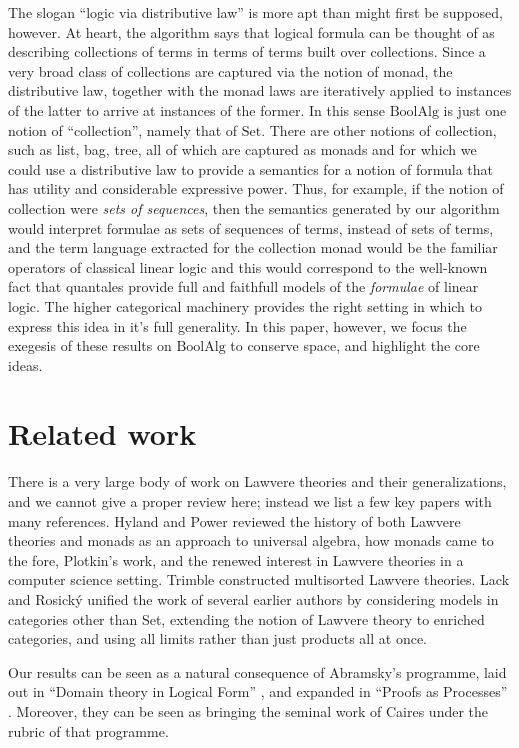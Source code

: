 \documentclass{llncs}
\newcommand{\Set}{\mathrm{Set}}
\newcommand{\BoolAlg}{\mathrm{BoolAlg}}
\begin{document}
The slogan ``logic via distributive law'' is more apt than might first
be supposed, however. At heart, the algorithm says that logical
formula can be thought of as describing collections of terms in terms
of terms built over collections. Since a very broad class of
collections are captured via the notion of monad, the distributive
law, together with the monad laws are iteratively applied to instances
of the latter to arrive at instances of the former. In this sense
$\BoolAlg$ is just one notion of ``collection'', namely that of
$\Set$. There are other notions of collection, such as list, bag,
tree, all of which are captured as monads and for which we could use a
distributive law to provide a semantics for a notion of formula that
has utility and considerable expressive power. Thus, for example, if
the notion of collection were \emph{sets of sequences}, then the
semantics generated by our algorithm would interpret formulae as sets
of sequences of terms, instead of sets of terms, and the term language
extracted for the collection monad would be the familiar operators of
classical linear logic and this would correspond to the well-known
fact that quantales provide full and faithfull models of the
\emph{formulae} of linear logic. The higher categorical machinery
provides the right setting in which to express this idea in it's full
generality. In this paper, however, we focus the exegesis of these
results on $\BoolAlg$ to conserve space, and highlight the core ideas.

\section{Related work}

There is a very large body of work on Lawvere theories and their
generalizations, and we cannot give a proper review here; instead we
list a few key papers with many references.  Hyland and Power
\cite{DBLP:journals/entcs/HylandP07} reviewed the history of both
Lawvere theories and monads as an approach to universal algebra, how
monads came to the fore, Plotkin's work, and the renewed interest in
Lawvere theories in a computer science setting.  Trimble
\cite{Trimble} constructed multisorted Lawvere theories.  Lack and
Rosick\'y \cite{DBLP:journals/acs/LackR11} unified the work of several
earlier authors by considering models in categories other than Set,
extending the notion of Lawvere theory to enriched categories, and
using all limits rather than just products all at once.

Our results can be seen as a natural consequence of Abramsky's
programme, laid out in ``Domain theory in Logical Form''
\cite{DBLP:journals/apal/Abramsky91}, and expanded in ``Proofs as
Processes'' \cite{Abramsky:1992:PP:194588.194591}.  Moreover, they can
be seen as bringing the seminal work of Caires \cite{Caires} under the
rubric of that programme.
\end{document}
